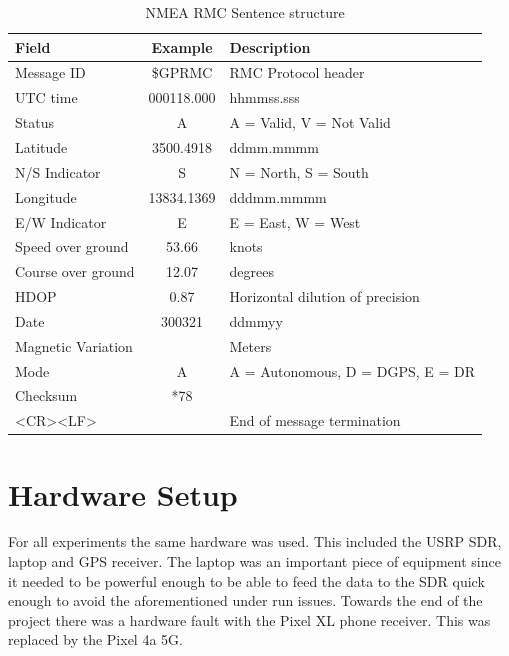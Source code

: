 \renewcommand{\arraystretch}{1.2}
\begin{table}[!h]
    \begin{center}
        \caption{NMEA RMC Sentence structure}
        \label{tab:NMEA RMC Struct}
        \begin{tabular}{ |m{4cm}|c|p{6cm}| }
            \hline
            \textbf{Field} & \textbf{Example} & \textbf{Description} \\
            \hline
            Message ID & \$GPRMC & RMC Protocol header \\
            \hline
            UTC time & 000118.000 & hhmmss.sss \\
            \hline
            Status & A & A = Valid, V = Not Valid \\
            \hline
            Latitude & 3500.4918 & ddmm.mmmm\\
            \hline
            N/S Indicator & S & N = North, S = South\\
            \hline
            Longitude & 13834.1369 & dddmm.mmmm \\
            \hline
            E/W Indicator & E & E = East, W = West\\
            \hline
            Speed over ground & 53.66 & knots \\
            \hline
            Course over ground & 12.07 & degrees \\
            \hline
            HDOP & 0.87 & Horizontal dilution of precision\\
            \hline
            Date & 300321 & ddmmyy \\
            \hline
            Magnetic Variation &  & Meters \\
            \hline
            Mode & A & A = Autonomous, D = DGPS, E = DR \\
            \hline
            Checksum & *78 &  \\
            \hline
            <CR><LF> & & End of message termination \\
            \hline
        \end{tabular}
    \end{center}
\end{table}
\renewcommand{\arraystretch}{1}

\section{Hardware Setup}
For all experiments the same hardware was used. This included the USRP SDR, laptop and GPS receiver. The laptop was an important piece of equipment since it needed to be
powerful enough to be able to feed the data to the SDR quick enough to avoid the aforementioned under run issues. Towards the end of the project there was a hardware fault
with the Pixel XL phone receiver. This was replaced by the Pixel 4a 5G.

